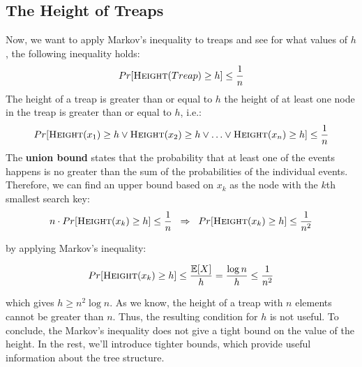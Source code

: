 \documentclass[11pt]{article}
\begin{document}
\subsection{The Height of Treaps}
Now, we want to apply Markov's inequality to treaps and see for what values of $h$, the following inequality holds:
\begin{equation*}
    Pr[\Call{Height}{Treap} \geq h] \leq  \frac{1}{n}
\end{equation*}
The height of a treap is greater than or equal to $h$ the height of at least one node in the treap is greater than or equal to $h$, i.e.:
\begin{equation*}
    Pr[\Call{Height}{x_1} \geq h \vee \Call{Height}{x_2} \geq h \vee \ldots  \vee \Call{Height}{x_n} \geq h] \leq  \frac{1}{n}
\end{equation*}
The \textbf{union bound} states that the probability that at least one of the events happens is no greater than the sum of the probabilities of the individual events. Therefore, we can find an upper bound based on $x_k$ as the node with the $k$th smallest search key:
\begin{align*}
    n \cdot Pr[\Call{Height}{x_k} \geq h] \leq \frac{1}{n} \hspace{0.2cm}\Rightarrow \hspace{0.2cm} Pr[\Call{Height}{x_k} \geq h] \leq \frac{1}{n^2}  
\end{align*}

by applying Markov's inequality:

\begin{equation*}
Pr[\Call{Height}{x_k} \geq h] \leq \frac{\mathbb{E}[X]}{h} = \frac{\log n}{h} \leq \frac{1}{n^2}   
\end{equation*}

which gives $h \geq n^2\log n$. As we know, the height of a treap with $n$ elements cannot be greater than $n$. Thus, the resulting condition for $h$ is not useful. To conclude, the Markov's inequality does not give a tight bound on the value of the height. In the rest, we'll introduce tighter bounds, which provide useful information about the tree structure.
\end{document}
